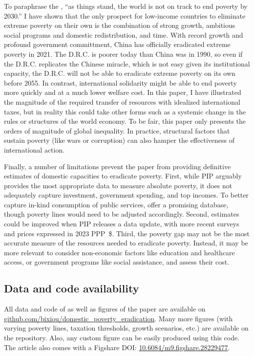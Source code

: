 \documentclass[12pt,english]{article}
\begin{document}
To paraphrase the \cite{un_sustainable_2022}, ``as things stand, the world is not on track to end poverty by 2030.'' I have shown that the only prospect for low-income countries to eliminate extreme poverty on their own is the combination of strong growth, ambitious social programs and domestic redistribution, and time. 
With record growth and profound government committment, China has officially eradicated extreme poverty in 2021. The D.R.C. is poorer today than China was in 1990, %
so even if the D.R.C. replicates the Chinese miracle, which is not easy given its institutional capacity, the D.R.C. will not be able to eradicate extreme poverty on its own before 2055. %
In contrast, international solidarity might be able to end poverty more quickly and at a much lower welfare cost. In this paper, I have illustrated the magnitude of the required transfer of resources with idealized international taxes, but in reality this could take other forms such as a systemic change in the rules or structures of the world economy. 
To be fair, this paper only presents the orders of magnitude of global inequality. %
In practice, structural factors that sustain poverty (like wars or corruption) %
can also hamper the effectiveness of international action. %

Finally, a number of limitations prevent the paper from providing definitive estimates of domestic capacities to eradicate poverty. First, while PIP arguably provides the most appropriate data to measure absolute poverty, it does not adequately capture investment, government spending, and top incomes. To better capture in-kind consumption of public services, \cite{fisher-post_government_2023} offer a promising database, though poverty lines would need to be adjusted accordingly. Second, estimates could be improved when PIP releases a data update, with more recent surveys and prices expressed in 2023 PPP~\$. Third, the poverty gap may not be the most accurate measure of the resources needed to eradicate poverty. Instead, it may be more relevant to consider non-economic factors like education and healthcare access, or government programs like social assistance, and assess their cost.

  \begin{small} %

\section*{\normalsize Data and code availability}

All data and code of as well as figures of the paper are available on \href{https://github.com/bixiou/domestic_poverty_eradication}{github.com/bixiou/domestic\_poverty\_eradication}. Many more figures (with varying poverty lines, taxation thresholds, growth scenarios, etc.) are available on the repository. %
Also, any custom figure can be easily produced using this code. The article also comes with a Figshare DOI: \href{https://figshare.com/articles/dataset/dx_doi_org_10_6084_m9_figshare_6025748/6025748}{10.6084/m9.figshare.28229477}.

\end{small}  %
\end{document}
